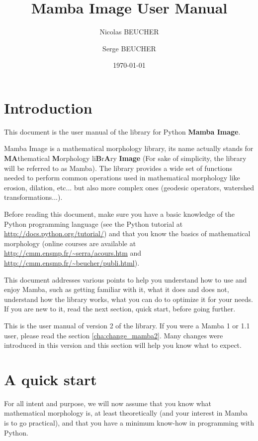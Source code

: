 \documentclass[a4paper,10pt,oneside]{article}
\title{Mamba Image User Manual}
\author{Nicolas BEUCHER \and Serge BEUCHER}
\date{\today}
\begin{document}
\mambaCover
\mambaContent
\mambaFigures

\section{Introduction}

This document is the user manual of the library for Python \textbf{Mamba Image}.

Mamba Image is a mathematical morphology library, its name actually stands for 
\textbf{MA}thematical \textbf{M}orphology li\textbf{B}r\textbf{A}ry \textbf{Image} 
(For sake of simplicity, the library will be referred to as Mamba). The library 
provides a wide set of functions needed to perform common operations used in 
mathematical morphology like erosion, dilation, etc... but also more complex ones
(geodesic operators, watershed transformations...).

Before reading this document, make sure you have a basic knowledge of the Python
programming language (see the Python tutorial at 
\url{http://docs.python.org/tutorial/}) and that you know the basics of 
mathematical morphology (online courses are available at 
\url{http://cmm.ensmp.fr/~serra/acours.htm} and \url{http://cmm.ensmp.fr/~beucher/publi.html}).

This document addresses various points to help you understand how to use and
enjoy Mamba, such as getting familiar with it, what it does and does not,
understand how the library works, what you can do to optimize it for your
needs. If you are new to it, read the next section, quick start, before going
further.

This is the user manual of version 2 of the library. If you were a Mamba 1 or
1.1 user, please read the section \ref{cha:change_mamba2}. Many changes
were introduced in this version and this section will help you know what to
expect.

\pagebreak

\section{A quick start}

For all intent and purpose, we will now assume that you know what mathematical
morphology is, at least theoretically (and your interest in Mamba is to go 
practical), and that you have a minimum know-how in programming with Python.
\end{document}
